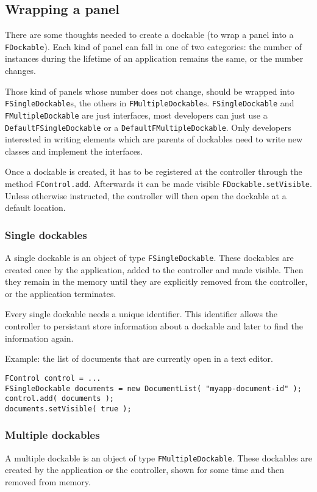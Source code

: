 \documentclass[a4paper,10pt]{article}
\newcommand{\src}[1]{\lstinline[basicstyle=\ttfamily]|#1|}
\begin{document}
\subsection{Wrapping a panel}
There are some thoughts needed to create a dockable (to wrap a panel into a \src{FDockable}). Each kind of panel can fall in one of two categories: the number of instances during the lifetime of an application remains the same, or the number changes.

Those kind of panels whose number does not change, should be wrapped into \src{FSingleDockable}s, the others in \src{FMultipleDockable}s. \src{FSingleDockable} and \src{FMultipleDockable} are just interfaces, most developers can just use a \src{DefaultFSingleDockable} or a \src{DefaultFMultipleDockable}. Only developers interested in writing elements which are parents of dockables need to write new classes and implement the interfaces.

Once a dockable is created, it has to be registered at the controller through the method \src{FControl.add}. Afterwards it can be made visible \src{FDockable.setVisible}. Unless otherwise instructed, the controller will then open the dockable at a default location.

\subsubsection{Single dockables}
A single dockable is an object of type \src{FSingleDockable}. These dockables are created once by the application, added to the controller and made visible. Then they remain in the memory until they are explicitly removed from the controller, or the application terminates.

Every single dockable needs a unique identifier. This identifier allows the controller to persistant store information about a dockable and later to find the information again.

Example: the list of documents that are currently open in a text editor.
\begin{lstlisting}
FControl control = ...
FSingleDockable documents = new DocumentList( "myapp-document-id" );
control.add( documents );
documents.setVisible( true );
\end{lstlisting}

\subsubsection{Multiple dockables}
A multiple dockable is an object of type \src{FMultipleDockable}. These dockables are created by the application or the controller, shown for some time and then removed from memory.
\end{document}
